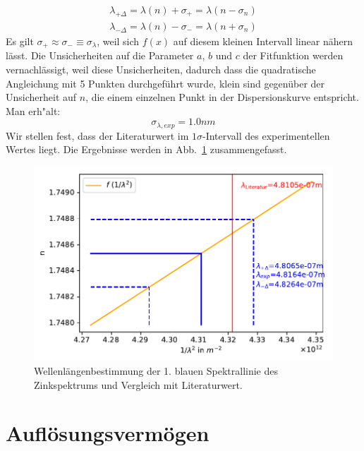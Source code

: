 \documentclass[12pt,a4paper]{article}
\begin{document}
\begin{align}
\lambda_{+\Delta}=\lambda(n)+\sigma_{+}=\lambda(n-\sigma_n)\\
\lambda_{-\Delta}=\lambda(n)-\sigma_{-}=\lambda(n+\sigma_n)
\end{align}
Es gilt $\sigma_+\approx\sigma_-\equiv\sigma_{\lambda}$, weil sich $f(x)$ auf diesem kleinen Intervall linear nähern lässt. Die Unsicherheiten auf die Parameter $a$, $b$ und $c$ der Fitfunktion werden vernachlässigt, weil diese Unsicherheiten, dadurch dass die quadratische Angleichung mit 5 Punkten durchgeführt wurde, klein sind gegenüber der Unsicherheit auf $n$, die einem einzelnen Punkt in der Dispersionskurve entspricht. Man erh"alt:
\begin{equation}
\sigma_{\lambda,exp}=1.0nm
\end{equation}
Wir stellen fest, dass der Literaturwert im $1\sigma$-Intervall des experimentellen Wertes liegt. Die Ergebnisse werden in Abb.~\ref{Zn_0} zusammengefasst.
\begin{figure}[H]
	\centering
	\includegraphics[width=\linewidth]{Python/Zn_0.pdf}
	\caption{Wellenlängenbestimmung der 1. blauen Spektrallinie des Zinkspektrums und Vergleich mit Literaturwert.}
	\label{Zn_0}
\end{figure}

\section{Auflösungsvermögen}
\end{document}
